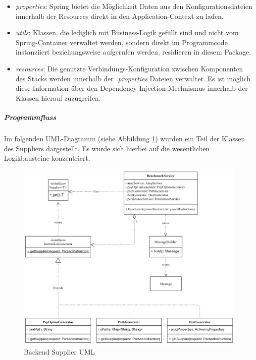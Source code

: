 \begin{itemize}
  \item \emph{properties}: Spring bietet die Möglichkeit Daten aus den Konfigurationsdateien innerhalb der Resources direkt in den Application-Context zu laden.
  
  \item \emph{utils}: Klassen, die lediglich mit Business-Logik gefüllt sind und nicht vom Spring-Container verwaltet werden, sondern direkt im Programmcode instanziiert beziehungsweise aufgerufen werden, residieren in diesem Package.
  
  \item \emph{resources}: Die genutzte Verbindungs-Konfiguration zwischen Komponenten des Stacks werden innerhalb der \emph{.properties} Dateien verwaltet. Es ist möglich diese Information über den Dependency-Injection-Mechnismus innerhalb der Klassen hierauf zuzugreifen.

\end{itemize}


\subparagraph{Programmfluss}
Im folgenden UML-Diagramm (siehe Abbildung \ref{fig:supplierUml}) wurden ein Teil der Klassen des Suppliers dargestellt. Es wurde sich hierbei auf die wesentlichen Logikbausteine konzentriert. 

\begin{figure}[ht!]
	\centering
	\includegraphics[width=\linewidth]{kapitel/problemloesung/implementierung/_img/supplier-uml}
	\caption[Backend Supplier UML]{Backend Supplier UML}
	\label{fig:supplierUml}
\end{figure}


